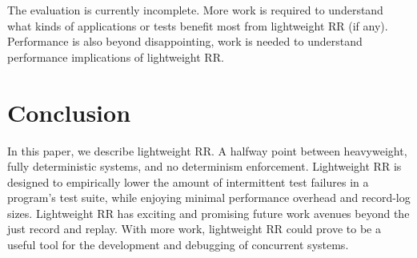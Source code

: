 The evaluation is currently incomplete. More work is required to understand what kinds
of applications or tests benefit most from lightweight RR (if any). Performance is also
beyond disappointing, work is needed to understand performance implications of lightweight
RR.

\section{Conclusion}
In this paper, we describe lightweight RR. A halfway point between heavyweight, fully
deterministic systems, and no determinism enforcement. Lightweight RR is designed to
empirically lower the amount of intermittent test failures in a program's test suite,
while enjoying minimal performance overhead and record-log sizes. Lightweight
RR has exciting and promising future work avenues beyond the just record and replay.
With more work, lightweight RR could prove to be a useful tool for the development
and debugging of concurrent systems.

